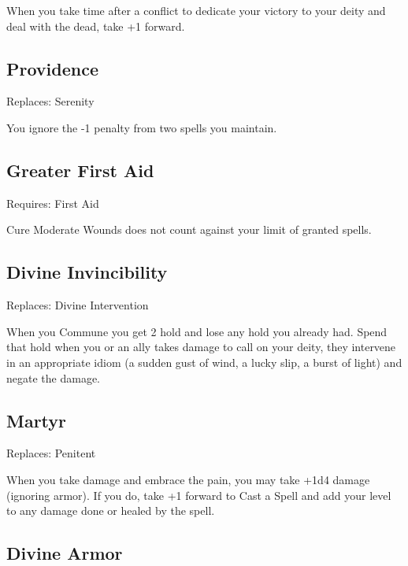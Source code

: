 When you take time after a conflict to dedicate your victory to your deity and deal with the dead, take +1 forward.

 
\subsection{Providence}   
 

Replaces: Serenity

 

You ignore the -1 penalty from two spells you maintain.

 
\subsection{Greater First Aid}    
 

Requires: First Aid

 

Cure Moderate Wounds does not count against your limit of granted spells.

 
\subsection{Divine Invincibility}    
 

Replaces: Divine Intervention

 

When you Commune you get 2 hold and lose any hold you already had. Spend that hold when you or an ally takes damage to call on your deity, they intervene in an appropriate idiom (a sudden gust of wind, a lucky slip, a burst of light) and negate the damage.

 
\subsection{Martyr}   
 

Replaces: Penitent

 

When you take damage and embrace the pain, you may take +1d4 damage (ignoring armor). If you do, take +1 forward to Cast a Spell and add your level to any damage done or healed by the spell.

 
\subsection{Divine Armor}    
 

